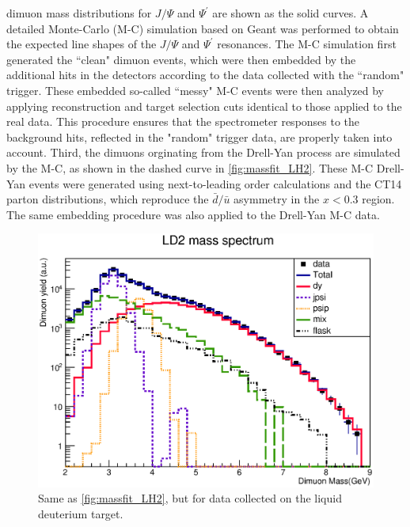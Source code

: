 \documentclass[reprint,aps,unsortedaddress,superscriptaddress,prd,floatfix,showpacs,linenumbers]{revtex4-2}
\begin{document}
dimuon mass distributions for $J/\Psi$ and $\Psi^\prime$ are shown as
the solid curves. A detailed Monte-Carlo (M-C) simulation based on Geant was
performed to obtain the expected line shapes of the $J/\Psi$ and $\Psi^\prime$
resonances. The M-C simulation first generated the ``clean" dimuon events,
which were then embedded by the additional hits in the detectors according to
the data collected with the ``random" trigger. These embedded 
so-called ``messy" M-C events were then analyzed by applying reconstruction
and target selection cuts identical to those applied to the real data. This
procedure ensures that the spectrometer responses to the background hits, 
reflected in the "random" trigger data, are properly taken into account.
Third, the dimuons orginating from the Drell-Yan process are simulated
by the M-C, as shown in the dashed curve in \cref{fig:massfit_LH2}. These M-C
Drell-Yan events were generated using next-to-leading order
calculations and the CT14 parton distributions,
which reproduce the $\bar{d}/ \bar{u}$ asymmetry in the $x < 0.3$ region.
The same embedding procedure was also applied to the Drell-Yan M-C data.

\begin{figure}
	\includegraphics[width=\linewidth]{massFit/LD2_massfit}
	\caption{Same as \cref{fig:massfit_LH2}, but for data collected on the liquid
		deuterium target.}
	\label{fig:massfit_LD2}
\end{figure}
\end{document}
